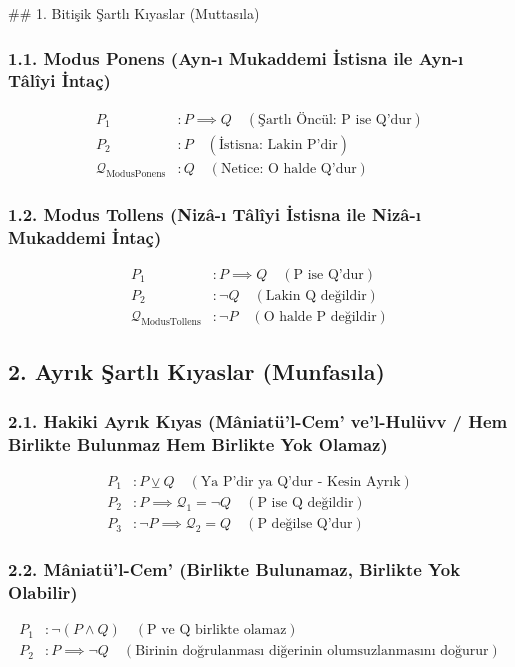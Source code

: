 \documentclass[11pt, a4paper]{article}
\begin{document}
\## 1. Bitişik Şartlı Kıyaslar (Muttasıla)

\subsubsection{1.1. Modus Ponens (Ayn-ı Mukaddemi İstisna ile Ayn-ı Tâlîyi İntaç)}
\begin{align}
P_1 &: P \implies Q \quad (\text{Şartlı Öncül: P ise Q'dur}) \\
P_2 &: P \quad (\text{İstisna: Lakin P'dir}) \\
\mathcal{Q}_{\text{ModusPonens}} &: Q \quad (\text{Netice: O halde Q'dur})
\end{align}

\subsubsection{1.2. Modus Tollens (Nizâ-ı Tâlîyi İstisna ile Nizâ-ı Mukaddemi İntaç)}
\begin{align}
P_1 &: P \implies Q \quad (\text{P ise Q'dur}) \\
P_2 &: \neg Q \quad (\text{Lakin Q değildir}) \\
\mathcal{Q}_{\text{ModusTollens}} &: \neg P \quad (\text{O halde P değildir})
\end{align}

\subsection{2. Ayrık Şartlı Kıyaslar (Munfasıla)}

\subsubsection{2.1. Hakiki Ayrık Kıyas (Mâniatü'l-Cem' ve'l-Hulüvv / Hem Birlikte Bulunmaz Hem Birlikte Yok Olamaz)}
\begin{align}
P_1 &: P \veebar Q \quad (\text{Ya P'dir ya Q'dur - Kesin Ayrık}) \\
P_2 &: P \implies \mathcal{Q}_1 = \neg Q \quad (\text{P ise Q değildir}) \\
P_3 &: \neg P \implies \mathcal{Q}_2 = Q \quad (\text{P değilse Q'dur})
\end{align}

\subsubsection{2.2. Mâniatü'l-Cem' (Birlikte Bulunamaz, Birlikte Yok Olabilir)}
\begin{align}
P_1 &: \neg (P \land Q) \quad (\text{P ve Q birlikte olamaz}) \\
P_2 &: P \implies \neg Q \quad (\text{Birinin doğrulanması diğerinin olumsuzlanmasını doğurur})
\end{align}
\end{document}
